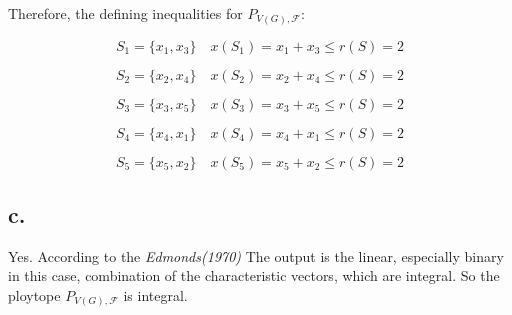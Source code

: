 \documentclass{article}
\begin{document}
{{        Therefore, the defining inequalities for \(\mathit{P}_{\mathit{V(G)},\mathcal{F}}\):

        \[\mathit{S}_{\mathrm{1}} = \{ \mathit{x}_{\mathrm{1}}, \mathit{x}_{\mathrm{3}}\} \quad \mathit{x}(\mathit{S}_{\mathrm{1}}) = \mathit{x}_{\mathrm{1}} + \mathit{x}_{\mathrm{3}} \leqslant \mathit{r(S)} = 2\]

        \[\mathit{S}_{\mathrm{2}} = \{ \mathit{x}_{\mathrm{2}}, \mathit{x}_{\mathrm{4}}\} \quad \mathit{x}(\mathit{S}_{\mathrm{2}}) = \mathit{x}_{\mathrm{2}} + \mathit{x}_{\mathrm{4}} \leqslant \mathit{r(S)} = 2\]

        \[\mathit{S}_{\mathrm{3}} = \{ \mathit{x}_{\mathrm{3}}, \mathit{x}_{\mathrm{5}}\} \quad \mathit{x}(\mathit{S}_{\mathrm{3}}) = \mathit{x}_{\mathrm{3}} + \mathit{x}_{\mathrm{5}} \leqslant \mathit{r(S)} = 2\]

        \[\mathit{S}_{\mathrm{4}} = \{ \mathit{x}_{\mathrm{4}}, \mathit{x}_{\mathrm{1}}\} \quad \mathit{x}(\mathit{S}_{\mathrm{4}}) = \mathit{x}_{\mathrm{4}} + \mathit{x}_{\mathrm{1}} \leqslant \mathit{r(S)} = 2\]

        \[\mathit{S}_{\mathrm{5}} = \{ \mathit{x}_{\mathrm{5}}, \mathit{x}_{\mathrm{2}}\} \quad \mathit{x}(\mathit{S}_{\mathrm{5}}) = \mathit{x}_{\mathrm{5}} + \mathit{x}_{\mathrm{2}} \leqslant \mathit{r(S)} = 2\]
    }
    \subsection*{c.}{
        Yes. According to the \textit{Edmonds(1970)} The output is the linear, especially binary in this case, combination of the characteristic vectors, which are integral. So the ploytope \(\mathit{P}_{\mathit{V(G)},\mathcal{F}}\) is integral.
    }
}
\end{document}
